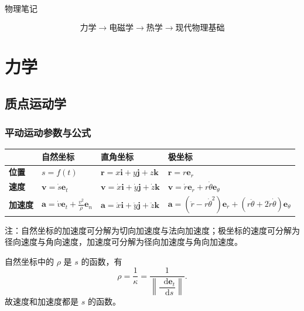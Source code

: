 \documentclass[UTF8,fontset=fandol,zihao=5]{ctexart}
\newcommand{\vect}[1]{\bm{#1}}
\newcommand{\dif}{\mathop{}\!\mathrm{d}}
\begin{document}
\pagestyle{plain}

\begin{center}
  {\heiti\headingfont{}\color{main} 物理笔记}
\end{center}

\vspace{0.45em}

\begin{relationbox}
\[
  \boxed{\text{力学}}
  \longrightarrow
  \boxed{\text{电磁学}}
  \longrightarrow
  \boxed{\text{热学}}
  \longrightarrow
  \boxed{\text{现代物理基础}}
\]
\end{relationbox}

\section{力学}

\subsection{质点运动学}

\subsubsection{平动运动参数与公式}

\begin{center}
\begin{tabularx}{0.98\textwidth}{>{\bfseries}p{1.5cm}X X X}
\toprule
 & 自然坐标 & 直角坐标 & 极坐标 \\
\midrule
位置 & \(s=f(t)\) & \(\vect r=x\vect i+y\vect j+z\vect k\) & \(\vect r=r\vect e_r\) \\
速度 & \(\vect v=\dot s\vect e_t\) & \(\vect v=\dot x\vect i+\dot y\vect j+\dot z\vect k\) & \(\vect v=\dot r\vect e_r+r\dot\theta\vect e_\theta\) \\
加速度 & \(\displaystyle\vect a=\dot v\vect e_t+\frac{v^2}{\rho}\vect e_n\) & \(\vect a=\ddot x\vect i+\ddot y\vect j+\ddot z\vect k\) & \(\displaystyle\vect a=(\ddot r-r\dot\theta^2)\vect e_r+(r\ddot\theta+2\dot r\dot\theta)\vect e_\theta\) \\
\bottomrule
\end{tabularx}
\end{center}

注：自然坐标的加速度可分解为切向加速度与法向加速度；极坐标的速度可分解为径向速度与角向速度，加速度可分解为径向加速度与角向加速度。

自然坐标中的 \(\rho\) 是 \(s\) 的函数，有
\[
  \rho=\frac{1}{\kappa}=\frac{1}{\left\lVert\dfrac{\dif\vect e_t}{\dif s}\right\rVert}.
\]
故速度和加速度都是 \(s\) 的函数。
\end{document}
